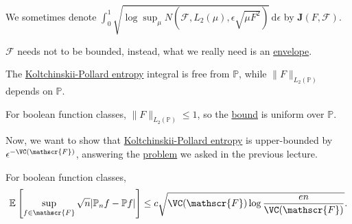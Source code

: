 \begin{notation}
	We sometimes denote \(\displaystyle \int_{0}^{1} \sqrt{\log \sup _\mu N(\mathscr{F} , L_2(\mu ), \epsilon \sqrt{\mu F^2} )}  \,\mathrm{d}\epsilon \) by \(\bm{J} (F, \mathscr{F} )\).
\end{notation}

\begin{remark}
	\(\mathscr{F} \) needs not to be bounded, instead, what we really need is an \hyperref[def:envelope]{envelope}.
\end{remark}

\begin{remark}
	The \hyperref[def:Koltchinskii-Pollard-entropy]{Koltchinskii-Pollard entropy} integral is free from \(\mathbb{P} \), while \(\lVert F \rVert _{L_2(\mathbb{P} )}\) depends on \(\mathbb{P} \).
\end{remark}

\begin{eg}
	For boolean function classes, \(\lVert F \rVert _{L_2(\mathbb{P} )} \leq 1\), so the \hyperref[thm:uniform-entropy-integral-bound]{bound} is uniform over \(\mathbb{P} \).
\end{eg}

Now, we want to show that \hyperref[def:Koltchinskii-Pollard-entropy]{Koltchinskii-Pollard entropy} is upper-bounded by \(\epsilon ^{-\VC(\mathscr{F} )}\), answering the \hyperref[prb:lec13]{problem} we asked in the previous lecture.

\begin{prev}
	For boolean function classes,
	\[
		\mathbb{E}_{}\left[\sup _{f\in \mathscr{F} } \sqrt{n} \vert \mathbb{P} _n f - \mathbb{P} f \vert  \right]
		\leq c \sqrt{\VC(\mathscr{F} )\log \frac{en}{\VC(\mathscr{F} )}} .
	\]
\end{prev}


